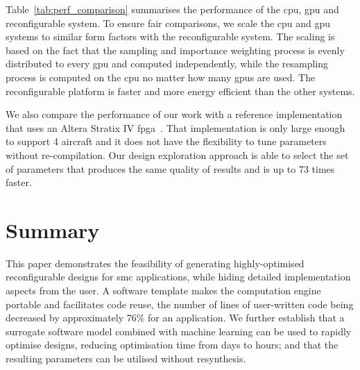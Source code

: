 Table~\ref{tab:perf_comparison} summarises the performance of the \gls{cpu}, \gls{gpu} and reconfigurable system.
To ensure fair comparisons, we scale the \gls{cpu} and \gls{gpu} systems to similar form factors with the reconfigurable system.
The scaling is based on the fact that the sampling and importance weighting process is evenly distributed to every \gls{gpu} and computed independently,
while the resampling process is computed on the \gls{cpu} no matter how many \gls{gpu}s are used.
The reconfigurable platform is faster and more energy efficient than the other systems.

We also compare the performance of our work with a reference implementation that uses an Altera Stratix IV \gls{fpga}~\cite{chau13b}.
That implementation is only large enough to support 4 aircraft and it does not have the flexibility to tune parameters without re-compilation.
Our design exploration approach is able to select the set of parameters that produces the same quality of results and is up to 73 times faster.



\section{Summary}
\label{sec:summary}

This paper demonstrates the feasibility of generating highly-optimised reconfigurable designs for \gls{smc} applications, while hiding detailed implementation aspects from the user.  
A software template makes the computation engine portable and facilitates code reuse, the number of lines of user-written code being decreased by approximately 76\% for an application.
We further establish that a surrogate software model combined with machine learning can be used to rapidly optimise designs, reducing optimisation time from days to hours; 
and that the resulting parameters can be utilised without resynthesis. 

